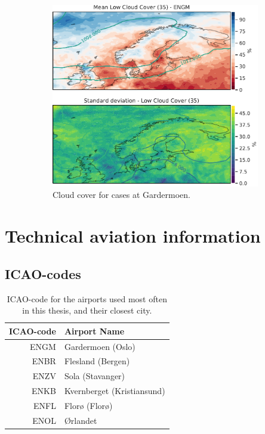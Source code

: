 \begin{figure}
    \begin{subfigure}[b]{0.5\textwidth}
    \centering
    \includegraphics[width=\textwidth]{Figures/CCENGM.pdf}
    \caption{Cloud cover for cases at Gardermoen.}
    \label{fig:ENGMCC}
\end{subfigure}
\caption{ }
\label{fig:cloudcoverairports}
\end{figure}

\chapter{Technical aviation information}

\section{ICAO-codes}

\begin{table}
    \centering
    \begin{tabular}{r|l}
        ICAO-code & Airport Name \\
        \hline
        ENGM & Gardermoen (Oslo) \\
        ENBR & Flesland (Bergen) \\
        ENZV & Sola (Stavanger)  \\
        ENKB & Kvernberget (Kristiansund) \\
        ENFL & Florø (Florø)     \\
        ENOL & Ørlandet \\
    \end{tabular}
    \caption{ICAO-code for the airports used most often in this thesis, and their closest city.}
    \label{tab:ICAO-table}
\end{table}

